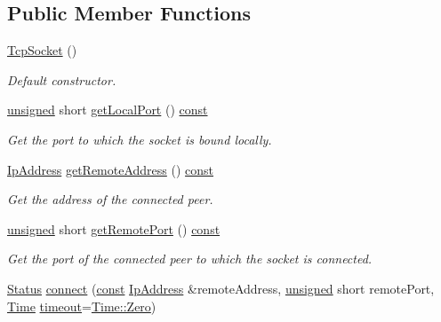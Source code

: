 \subsection*{Public Member Functions}
\begin{DoxyCompactItemize}
\item 
\hyperlink{classsf_1_1_tcp_socket_a62a9bf81fd7f15fedb29fd1348483236}{Tcp\-Socket} ()
\begin{DoxyCompactList}\small\item\em Default constructor. \end{DoxyCompactList}\item 
\hyperlink{curses_8priv_8h_aca40206900cfc164654362fa8d4ad1e6}{unsigned} short \hyperlink{classsf_1_1_tcp_socket_ab47eeb1cb71f2f251a83bc823773f1b3}{get\-Local\-Port} () \hyperlink{term__entry_8h_a57bd63ce7f9a353488880e3de6692d5a}{const} 
\begin{DoxyCompactList}\small\item\em Get the port to which the socket is bound locally. \end{DoxyCompactList}\item 
\hyperlink{classsf_1_1_ip_address}{Ip\-Address} \hyperlink{classsf_1_1_tcp_socket_a7904ca6ab9e018021e305a3aeb7a1b9a}{get\-Remote\-Address} () \hyperlink{term__entry_8h_a57bd63ce7f9a353488880e3de6692d5a}{const} 
\begin{DoxyCompactList}\small\item\em Get the address of the connected peer. \end{DoxyCompactList}\item 
\hyperlink{curses_8priv_8h_aca40206900cfc164654362fa8d4ad1e6}{unsigned} short \hyperlink{classsf_1_1_tcp_socket_abc05220e06f1522144cecab822e79296}{get\-Remote\-Port} () \hyperlink{term__entry_8h_a57bd63ce7f9a353488880e3de6692d5a}{const} 
\begin{DoxyCompactList}\small\item\em Get the port of the connected peer to which the socket is connected. \end{DoxyCompactList}\item 
\hyperlink{classsf_1_1_socket_a51bf0fd51057b98a10fbb866246176dc}{Status} \hyperlink{classsf_1_1_tcp_socket_a68cd42d5ab70ab54b16787f555951c40}{connect} (\hyperlink{term__entry_8h_a57bd63ce7f9a353488880e3de6692d5a}{const} \hyperlink{classsf_1_1_ip_address}{Ip\-Address} \&remote\-Address, \hyperlink{curses_8priv_8h_aca40206900cfc164654362fa8d4ad1e6}{unsigned} short remote\-Port, \hyperlink{classsf_1_1_time}{Time} \hyperlink{_ndk_8cpp_a174cf046f3b5dbb1258515b3f138b8c7}{timeout}=\hyperlink{classsf_1_1_time_aa343e67f43a940e7b3b51aa10a495f2f}{Time\-::\-Zero})

\end{DoxyCompactItemize}
